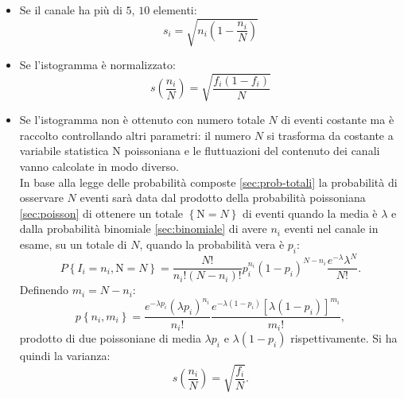 \begin{itemize}
\item Se il canale ha più di $5$, $10$ elementi:
\begin{equation}
{ s }_{ i }=\sqrt { { n }_{ i }\left( 1-\frac { { n }_{ i } }{ N }  \right)  } 
\end{equation}
\item Se l'istogramma è normalizzato: 
\begin{equation}
{ s }\left( \frac { { n }_{ i } }{ N }  \right) =\sqrt { \frac { { f }_{ i }\left( 1-{ f }_{ i } \right)  }{ N }  } 
\end{equation}
\item Se l'istogramma non è ottenuto con numero totale $N$ di eventi costante ma è raccolto controllando altri parametri: il numero $N$ si trasforma da costante a variabile statistica N poissoniana e le fluttuazioni del contenuto dei canali vanno calcolate in modo diverso. \\ In base alla legge delle probabilità composte \ref{sec:prob-totali} la probabilità di osservare $N$ eventi sarà data dal prodotto della probabilità poissoniana \ref{sec:poisson} di ottenere un totale $\left\{ \textrm{N}=N \right\} $ di eventi quando la media è $\lambda$ e dalla probabilità binomiale \ref{sec:binomiale} di avere $n_i$ eventi nel canale in esame, su un totale di $N$, quando la probabilità vera è $p_i$:
\[
P\left\{ { I }_{ i }={ n }_{ i },\textrm{N}=N \right\} =\frac { N! }{ { n }_{ i }!\left( N-{ n }_{ i } \right) ! } { p }_{ i }^{ { n }_{ i } }{ \left( 1-{ p }_{ i } \right)  }^{ N-{ n }_{ i } }\frac { { e }^{ -\lambda  }{ \lambda  }^{ N } }{ N! } .
\]
Definendo $m_i=N-n_i$:
\[
p\left\{ { n }_{ i },{ m }_{ i } \right\} =\frac { { e }^{ -\lambda { p }_{ i } }{ \left( \lambda { p }_{ i } \right)  }^{ { n }_{ i } } }{ { n }_{ i }! } \frac { { e }^{ -\lambda \left( 1-{ p }_{ i } \right)  }{ \left[ \lambda \left( 1-{ p }_{ i } \right)  \right]  }^{ { m }_{ i } } }{ { m }_{ i }! },
\]
prodotto di due poissoniane di media $\lambda p_i$ e $\lambda \left( 1-{ p }_{ i } \right) $ rispettivamente.
Si ha quindi la varianza:
\begin{equation}
{ s }\left( \frac { { n }_{ i } }{ N }  \right) =\sqrt { \frac { { f }_{ i } }{ N }  } .
\end{equation}
\end{itemize}

